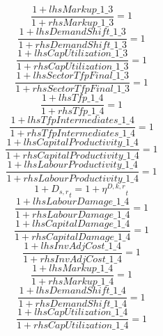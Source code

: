 \begin{dmath}
\frac{1+{lhsMarkup\_1\_3}}{1+{rhsMarkup\_1\_3}}=1
\end{dmath}
\begin{dmath}
\frac{1+{lhsDemandShift\_1\_3}}{1+{rhsDemandShift\_1\_3}}=1
\end{dmath}
\begin{dmath}
\frac{1+{lhsCapUtilization\_1\_3}}{1+{rhsCapUtilization\_1\_3}}=1
\end{dmath}
\begin{dmath}
\frac{1+{lhsSectorTfpFinal\_1\_3}}{1+{rhsSectorTfpFinal\_1\_3}}=1
\end{dmath}
\begin{dmath}
\frac{1+{lhsTfp\_1\_4}}{1+{rhsTfp\_1\_4}}=1
\end{dmath}
\begin{dmath}
\frac{1+{lhsTfpIntermediates\_1\_4}}{1+{rhsTfpIntermediates\_1\_4}}=1
\end{dmath}
\begin{dmath}
\frac{1+{lhsCapitalProductivity\_1\_4}}{1+{rhsCapitalProductivity\_1\_4}}=1
\end{dmath}
\begin{dmath}
\frac{1+{lhsLabourProductivity\_1\_4}}{1+{rhsLabourProductivity\_1\_4}}=1
\end{dmath}
\begin{dmath}
1+{{D_{s,r}}}_{t}=1+{{\eta^{D,k,r}}}_{t}
\end{dmath}
\begin{dmath}
\frac{1+{lhsLabourDamage\_1\_4}}{1+{rhsLabourDamage\_1\_4}}=1
\end{dmath}
\begin{dmath}
\frac{1+{lhsCapitalDamage\_1\_4}}{1+{rhsCapitalDamage\_1\_4}}=1
\end{dmath}
\begin{dmath}
\frac{1+{lhsInvAdjCost\_1\_4}}{1+{rhsInvAdjCost\_1\_4}}=1
\end{dmath}
\begin{dmath}
\frac{1+{lhsMarkup\_1\_4}}{1+{rhsMarkup\_1\_4}}=1
\end{dmath}
\begin{dmath}
\frac{1+{lhsDemandShift\_1\_4}}{1+{rhsDemandShift\_1\_4}}=1
\end{dmath}
\begin{dmath}
\frac{1+{lhsCapUtilization\_1\_4}}{1+{rhsCapUtilization\_1\_4}}=1
\end{dmath}
